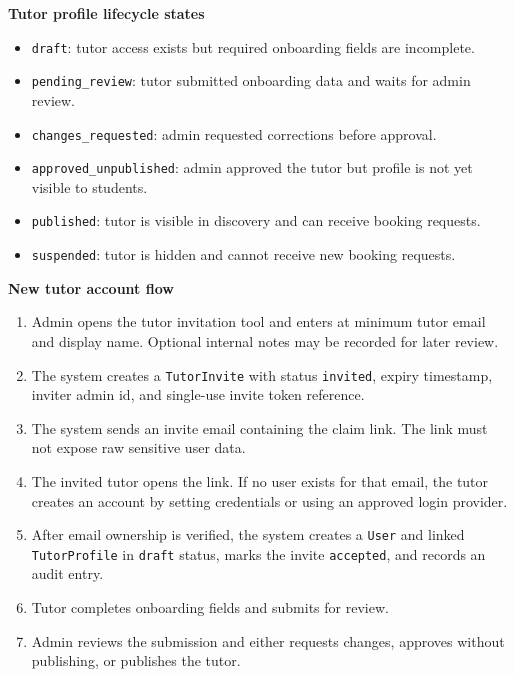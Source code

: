 \documentclass[11pt,a4paper]{article}
\begin{document}
\textbf{Tutor profile lifecycle states}
\begin{itemize}
    \item \texttt{draft}: tutor access exists but required onboarding fields are incomplete.
    \item \texttt{pending\_review}: tutor submitted onboarding data and waits for admin review.
    \item \texttt{changes\_requested}: admin requested corrections before approval.
    \item \texttt{approved\_unpublished}: admin approved the tutor but profile is not yet visible to students.
    \item \texttt{published}: tutor is visible in discovery and can receive booking requests.
    \item \texttt{suspended}: tutor is hidden and cannot receive new booking requests.
\end{itemize}

\textbf{New tutor account flow}
\begin{enumerate}
    \item Admin opens the tutor invitation tool and enters at minimum tutor email and display name. Optional internal notes may be recorded for later review.
    \item The system creates a \texttt{TutorInvite} with status \texttt{invited}, expiry timestamp, inviter admin id, and single-use invite token reference.
    \item The system sends an invite email containing the claim link. The link must not expose raw sensitive user data.
    \item The invited tutor opens the link. If no user exists for that email, the tutor creates an account by setting credentials or using an approved login provider.
    \item After email ownership is verified, the system creates a \texttt{User} and linked \texttt{TutorProfile} in \texttt{draft} status, marks the invite \texttt{accepted}, and records an audit entry.
    \item Tutor completes onboarding fields and submits for review.
    \item Admin reviews the submission and either requests changes, approves without publishing, or publishes the tutor.
\end{enumerate}
\end{document}
